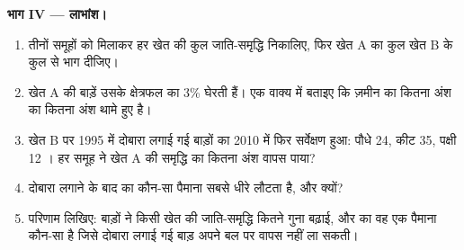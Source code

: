 \begin{problem}
\medskip
\noindent\textbf{भाग IV --- लाभांश।}
\begin{enumerate}[resume]
  \item तीनों समूहों को मिलाकर हर खेत की कुल जाति-समृद्धि निकालिए,
        फिर खेत A का कुल खेत B के कुल से भाग दीजिए।
  \item खेत A की बाड़ें उसके क्षेत्रफल का 3\% घेरती हैं। एक वाक्य में
        बताइए कि ज़मीन का कितना अंश  का कितना अंश थामे हुए है।
  \item खेत B पर 1995 में दोबारा लगाई गई बाड़ों का 2010 में फिर
        सर्वेक्षण हुआ: पौधे 24, कीट 35, पक्षी 12 । हर समूह ने
        खेत A की समृद्धि का कितना अंश वापस पाया?
  \item दोबारा लगाने के बाद  का कौन-सा पैमाना सबसे धीरे लौटता
        है, और क्यों?
  \item परिणाम लिखिए: बाड़ों ने किसी खेत की जाति-समृद्धि कितने गुना
        बढ़ाई, और  का वह एक पैमाना कौन-सा है जिसे दोबारा लगाई
        गई बाड़ अपने बल पर वापस नहीं ला सकती।
\end{enumerate}
\end{problem}
